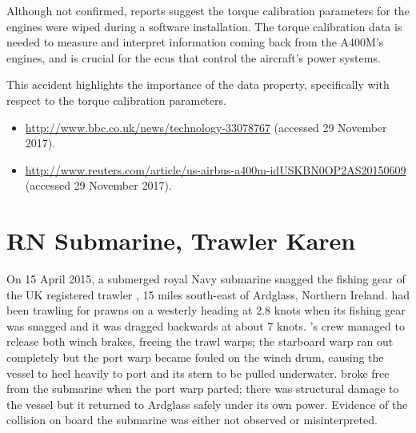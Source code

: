 Although not confirmed, reports suggest the torque calibration parameters for the engines were wiped during a software installation. The torque calibration data is needed to measure and interpret \gls{information} coming back from the A400M's engines, and is crucial for the \glspl{ecu} that control the aircraft's power systems. 

This accident highlights the importance of the  \gls{data property}, specifically with respect to the torque calibration parameters.

\begin{samepage}
\begin{itemize}
  \item \raggedright{\href{http://www.bbc.co.uk/news/technology-33078767}{http://www.bbc.co.uk/news/technology-33078767} (accessed 29 November 2017).}
  \item \raggedright{\href{http://www.reuters.com/article/us-airbus-a400m-idUSKBN0OP2AS20150609}{http://www.reuters.com/article/us-airbus-a400m-idUSKBN0OP2AS20150609} (accessed 29 November 2017).}
\end{itemize}
\end{samepage}


\section{RN Submarine, Trawler Karen} \label{bkm:incacc:subtrawler}
On 15 April 2015, a submerged royal Navy submarine snagged the fishing gear of the UK registered trawler , 15 miles south-east of Ardglass, Northern Ireland.  had been trawling for prawns on a westerly heading at 2.8 knots when its fishing gear was snagged and it was dragged backwards at about 7 knots. 's crew managed to release both winch brakes, freeing the trawl warps; the starboard warp ran out completely but the port warp became fouled on the winch drum, causing the vessel to heel heavily to port and its stern to be pulled underwater.  broke free from the submarine when the port warp parted; there was structural damage to the vessel but it returned to Ardglass safely under its own power. Evidence of the collision on board the submarine was either not observed or misinterpreted. 

